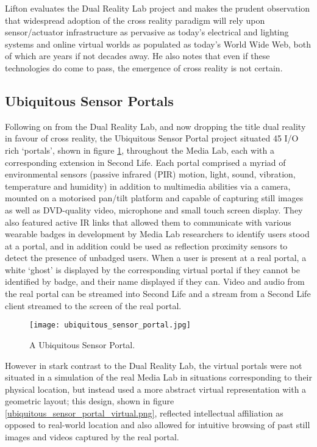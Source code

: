 Lifton evaluates the Dual Reality Lab project and makes the prudent observation that widespread adoption of the cross reality paradigm will rely upon sensor/actuator infrastructure as pervasive as today's electrical and lighting systems and online virtual worlds as populated as today's World Wide Web, both of which are years if not decades away. He also notes that even if these technologies do come to pass, the emergence of cross reality is not certain.

\subsection{Ubiquitous Sensor Portals}
Following on from the Dual Reality Lab, and now dropping the title dual reality in favour of cross reality, the Ubiquitous Sensor Portal project situated 45 I/O rich `portals', shown in figure \ref{ubiquitous_sensor_portal.jpg}, throughout the Media Lab, each with a corresponding extension in Second Life. Each portal comprised a myriad of environmental sensors (passive infrared (PIR) motion, light, sound, vibration, temperature and humidity) in addition to multimedia abilities via a camera, mounted on a motorised pan/tilt platform and capable of capturing still images as well as DVD-quality video, microphone and small touch screen display. They also featured active IR links that allowed them to communicate with various wearable badges in development by Media Lab researchers to identify users stood at a portal, and in addition could be used as reflection proximity sensors to detect the presence of unbadged users. When a user is present at a real portal, a white `ghost' is displayed by the corresponding virtual portal if they cannot be identified by badge, and their name displayed if they can. Video and audio from the real portal can be streamed into Second Life and a stream from a Second Life client streamed to the screen of the real portal.

\begin{figure}[h]
\centering
\texttt{[image: ubiquitous\_sensor\_portal.jpg]}
\caption{A Ubiquitous Sensor Portal.}
\label{ubiquitous_sensor_portal.jpg}
\end{figure}

However in stark contrast to the Dual Reality Lab, the virtual portals were not situated in a simulation of the real Media Lab in situations corresponding to their physical location, but instead used a more abstract virtual representation with a geometric layout; this design, shown in figure \ref{ubiquitous_sensor_portal_virtual.png}, reflected intellectual affiliation as opposed to real-world location and also allowed for intuitive browsing of past still images and videos captured by the real portal.


